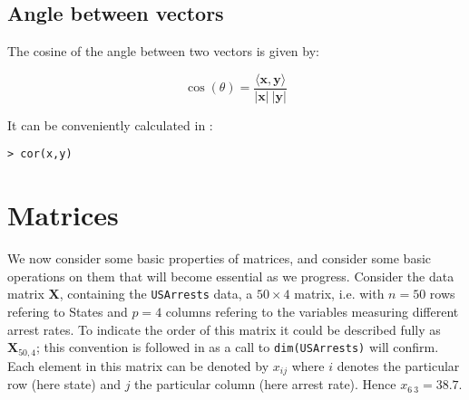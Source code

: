 \subsection{Angle between vectors}
\label{angle}

The cosine of the angle between two vectors is given by:

\begin{displaymath}
\cos(\theta) = \frac{\langle \boldsymbol{x}, \boldsymbol{y} \rangle}{|\boldsymbol{x}|\ |\boldsymbol{y}|}
\end{displaymath}

It can be conveniently calculated in \R:
\singlespacing
\begin{verbatim}
> cor(x,y)
\end{verbatim}
\onehalfspacing



\section{Matrices}
\label{matrices}


We now consider some basic properties of matrices, and consider some basic operations on them that will become essential as we progress.   Consider the data matrix $\boldsymbol{X}$, containing the \verb+USArrests+ data, a $50 \times 4$ matrix, i.e. with $n=50$ rows refering to States and $p=4$ columns refering to the variables measuring different arrest rates.   To indicate the order of this matrix it could be described fully as $\boldsymbol{X}_{50,4}$; this convention is followed in \R as a call to \verb+dim(USArrests)+ will confirm.   Each element in this matrix can be denoted by $x_{ij}$ where $i$ denotes the particular row (here state) and $j$ the particular column (here arrest rate).   Hence $x_{6\ 3} = 38.7$.

